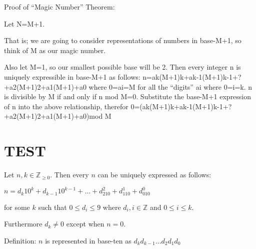 \documentclass{article}
\newenvironment{jprIn}{\begin{adjustwidth}{2em}{}}{\end{adjustwidth}}
\begin{document}
Proof of ``Magic Number'' Theorem:

Let N=M+1.

That is; we are going to consider representations of numbers in base-M+1, so think of M as our magic number.

Also let M=1, so our smallest possible base will be 2.
Then every integer n is uniquely expressible in base-M+1 as follows:
n=ak(M+1)k+ak-1(M+1)k-1+?+a2(M+1)2+a1(M+1)+a0
where 0=ai=M for all the ``digits'' ai where 0=i=k.
n is divisible by M if and only if n mod M=0. 
Substitute the base-M+1 expression of n into the above relationship, therefor
0=(ak(M+1)k+ak-1(M+1)k-1+?+a2(M+1)2+a1(M+1)+a0)mod M


\section*{TEST}

\begin{jprIn}
Let $n,k\in \mathbb{Z}_{\ge 0}$. Then every $n$ can be uniquely expressed as follows:

\hspace{3em}$n=d_k10^k+d_{k-1}10^{k-1}+\dots+d_210^2+d_110^1+d_010^0$

for some $k$ such that $0 \le d_i \le 9$ where $d_i,i\in\mathbb{Z}$ and $0 \le i \le k$.

Furthermore $d_k\ne0$ except when $n=0$.

Definition: $n$ is represented in base-ten as $d_kd_{k-1}\dots{}d_2d_1d_0$
\end{jprIn}
\bigskip
\end{document}
